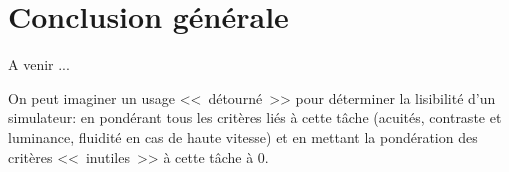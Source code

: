 \chapter*{Conclusion générale}

\lettrine[lines=3]{A}{} venir ...

\par On peut imaginer un usage <<~détourné~>> pour déterminer la lisibilité d'un simulateur: en pondérant tous les critères liés à cette tâche (acuités, contraste et luminance, fluidité en cas de  haute vitesse) et en mettant la pondération des critères <<~inutiles~>> à cette tâche à 0.